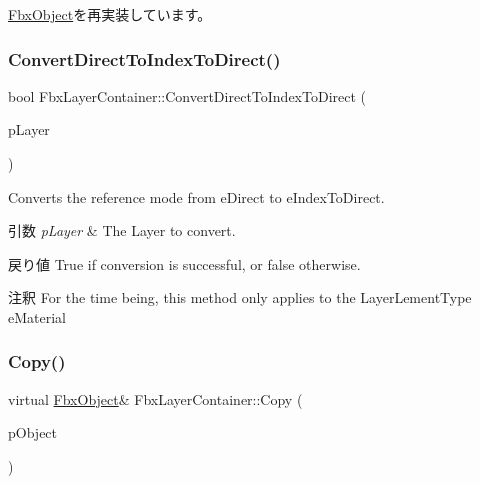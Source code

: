 \hyperlink{class_fbx_object_ab7a400f3829d1f0da57d3d78c8168dd0}{Fbx\+Object}を再実装しています。

\mbox{\label{class_fbx_layer_container_a51f106917fbb0a9558f1f0ee1f7d7059}} 
\subsubsection{\texorpdfstring{Convert\+Direct\+To\+Index\+To\+Direct()}{ConvertDirectToIndexToDirect()}}
{\footnotesize\ttfamily bool Fbx\+Layer\+Container\+::\+Convert\+Direct\+To\+Index\+To\+Direct (\begin{DoxyParamCaption}\item[{int}]{p\+Layer }\end{DoxyParamCaption})}

Converts the reference mode from e\+Direct to e\+Index\+To\+Direct. 
\begin{DoxyParams}{引数}
{\em p\+Layer} & The Layer to convert. \\
\hline
\end{DoxyParams}
\begin{DoxyReturn}{戻り値}
{\ttfamily True} if conversion is successful, or {\ttfamily false} otherwise. 
\end{DoxyReturn}
\begin{DoxyRemark}{注釈}
For the time being, this method only applies to the Layer\+Lement\+Type e\+Material 
\end{DoxyRemark}
\mbox{\label{class_fbx_layer_container_abb8c7ba2b201b4e4ff39b2c8db144769}} 
\subsubsection{\texorpdfstring{Copy()}{Copy()}}
{\footnotesize\ttfamily virtual \hyperlink{class_fbx_object}{Fbx\+Object}\& Fbx\+Layer\+Container\+::\+Copy (\begin{DoxyParamCaption}\item[{const \hyperlink{class_fbx_object}{Fbx\+Object} \&}]{p\+Object }\end{DoxyParamCaption})\hspace{0.3cm}{\ttfamily [virtual]}}

